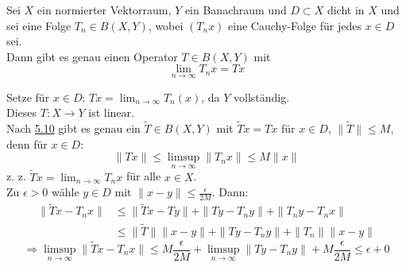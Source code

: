\begin{kor} \label{kor:5.11}
	Sei $X$ ein normierter Vektorraum, $Y$ ein Banachraum und $D \subset X$ dicht in $X$ und sei eine Folge $T_{n} \in B(X, Y)$, wobei $(T_{n} x)$ eine Cauchy-Folge für jedes $x \in D$ sei. \\
		Dann gibt es genau einen Operator $T \in B(X, Y)$ mit
		\[ \lim_{n \rightarrow \infty} T_{n} x = T x \]
	\begin{beweis}
		Setze für $x \in D$: $Tx = \lim_{n \rightarrow \infty} T_{n}(x)$, da $Y$ vollständig. \\
		Dieses $T: X \rightarrow Y$ ist linear. \\ 
		Nach \hyperref[prop:5.10]{5.10} gibt es genau ein $\tilde T \in B(X, Y)$ mit $\tilde T x = T x$ für $x \in D$, $\| \tilde T \| \leq M$, denn für $x \in D$:
		\[ \| T x \| \leq \limsup_{n \rightarrow \infty} \| T_{n} x \| \leq M \| x \| \]
		z. z. $\tilde T x = \lim_{n \rightarrow \infty} T_{n} x$ für alle $x \in X$. \\
		Zu $\epsilon > 0$ wähle $y \in D$ mit $\| x - y \| \leq \frac{\epsilon}{2 M}$. Dann:
		\begin{align*}
			\| \tilde T x - T_{n} x \| & \leq \| \tilde T x - T y \| + \| T y - T_{n} y \| +  \| T_{n} y - T_{n} x \| \\
				& \leq \| \tilde T \| \| x - y \| + \| T y - T_{n} y \| + \| T_{n} \| \| x - y\| 
		\end{align*}
		\[ \Rightarrow \limsup_{n \rightarrow \infty}  \| \tilde T x - T_{n} x \| \leq M \frac{\epsilon}{2 M} + \limsup_{n \rightarrow \infty} \| T y - T_{n} y \| + M \frac{\epsilon}{2 M} \leq \epsilon + 0 \]
	\end{beweis}
\end{kor}


